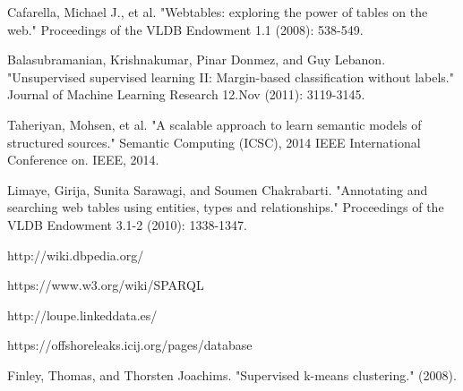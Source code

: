 \documentclass{article}
\begin{document}
 
\begin{thebibliography}{99}

Cafarella, Michael J., et al. "Webtables: exploring the power of tables on the web." Proceedings of the VLDB Endowment 1.1 (2008): 538-549.

Balasubramanian, Krishnakumar, Pinar Donmez, and Guy Lebanon. "Unsupervised supervised learning II: Margin-based classification without labels." Journal of Machine Learning Research 12.Nov (2011): 3119-3145.

Taheriyan, Mohsen, et al. "A scalable approach to learn semantic models of structured sources." Semantic Computing (ICSC), 2014 IEEE International Conference on. IEEE, 2014.

Limaye, Girija, Sunita Sarawagi, and Soumen Chakrabarti. "Annotating and searching web tables using entities, types and relationships." Proceedings of the VLDB Endowment 3.1-2 (2010): 1338-1347.

http://wiki.dbpedia.org/

https://www.w3.org/wiki/SPARQL

http://loupe.linkeddata.es/

https://offshoreleaks.icij.org/pages/database

Finley, Thomas, and Thorsten Joachims. "Supervised k-means clustering." (2008).














\end{thebibliography}
\end{document}
